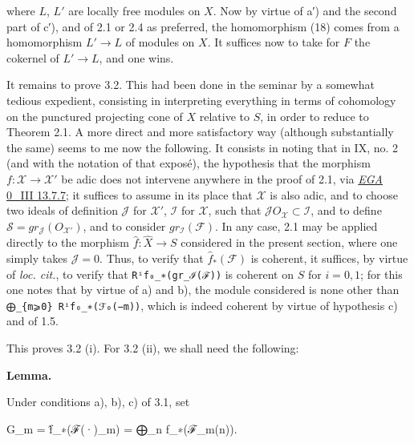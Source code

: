 \documentclass[
  11pt,
  a4paper,
]{book}
\newenvironment{Shaded}{}{}
\newcommand{\NormalTok}[1]{#1}
\newcounter{none} %
\begin{document}
where \(L\), \(L'\) are locally free modules on \(X\). Now by virtue of
a′) and the second part of c′), and of 2.1 or 2.4 as preferred, the
homomorphism (18) comes from a homomorphism \(L' \to L\) of modules on
\(X\). It suffices now to take for \(F\) the cokernel of \(L' \to L\),
and one wins.

It remains to prove 3.2. This had been done in the seminar by a somewhat
tedious expedient, consisting in interpreting everything in terms of
cohomology on the punctured projecting cone of \(X\) relative to \(S\),
in order to reduce to Theorem 2.1. A more direct and more satisfactory
way (although substantially the same) seems to me now the following. It
consists in noting that in IX, no. 2 (and with the notation of that
exposé), the hypothesis that the morphism \(f:
\mathcal{X} \to \mathcal{X}'\) be adic does not intervene anywhere in
the proof of 2.1, via
\href{https://jcreinhold.github.io/ega/iii/06-ch0-13-projective-limits-homological-algebra.html\#137-derived-functors-of-a-projective-limit-of-arguments}{\emph{EGA}
0\_III 13.7.7}; it suffices to assume in its place that \(\mathcal{X}\)
is also adic, and to choose two ideals of definition \(\mathcal{J}\) for
\(\mathcal{X}'\), \(\mathcal{I}\) for \(\mathcal{X}\), such that
\(\mathcal{J} O_{\mathcal{X}} \subset \mathcal{I}\), and to define
\(\mathcal{S} = gr_{\mathcal{J}}(O_{\mathcal{X}'})\), and to consider
\(gr_{\mathcal{I}}(\mathcal{F})\). In any case, 2.1 may be applied
directly to the morphism \(\hat{f}: \hat{X} \to S\) considered in the
present section, where one simply takes \(\mathcal{J} = 0\). Thus, to
verify that \(\hat{f}_{\ast}(\mathcal{F})\) is coherent, it suffices, by
virtue of \emph{loc. cit.}, to verify that \texttt{Rⁱf₀\_∗(gr\_ℐ(ℱ))} is
coherent on \(S\) for \(i = 0, 1\); for this one notes that by virtue of
a) and b), the module considered is none other than
\texttt{⨁\_\{m⩾0\}\ Rⁱf₀\_∗(ℱ₀(−m))}, which is indeed coherent by virtue
of hypothesis c) and of 1.5.

This proves 3.2 (i). For 3.2 (ii), we shall need the following:

\textbf{Lemma.}

Under conditions a), b), c) of 3.1, set

\begin{Shaded}
\begin{Highlighting}[]
\NormalTok{G\_m = f̂\_∗(ℱ(·)\_m) = ⨁\_n f\_∗(ℱ\_m(n)).}
\end{Highlighting}
\end{Shaded}
\end{document}
